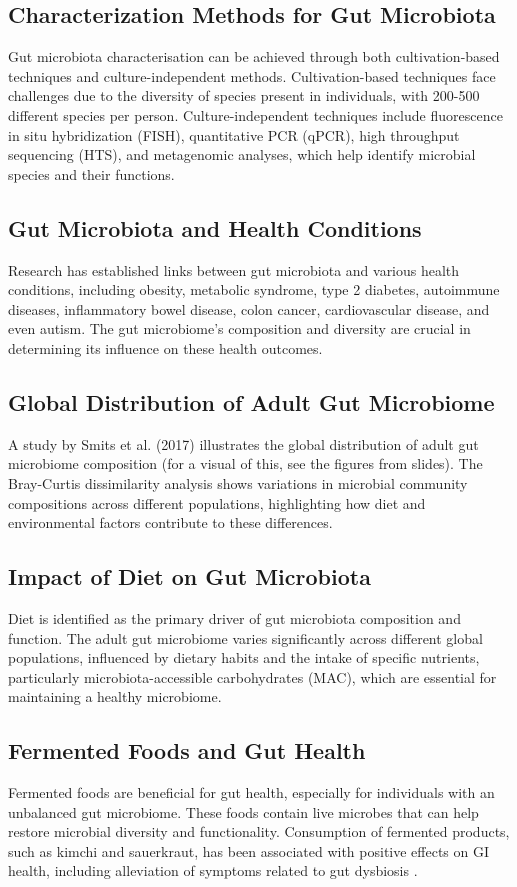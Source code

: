 \subsection{Characterization Methods for Gut Microbiota} 
Gut microbiota characterisation can be achieved through both cultivation-based techniques and culture-independent methods. Cultivation-based techniques face challenges due to the diversity of species present in individuals, with 200-500 different species per person. Culture-independent techniques include fluorescence in situ hybridization (FISH), quantitative PCR (qPCR), high throughput sequencing (HTS), and metagenomic analyses, which help identify microbial species and their functions.

\subsection{Gut Microbiota and Health Conditions} 
Research has established links between gut microbiota and various health conditions, including obesity, metabolic syndrome, type 2 diabetes, autoimmune diseases, inflammatory bowel disease, colon cancer, cardiovascular disease, and even autism. The gut microbiome's composition and diversity are crucial in determining its influence on these health outcomes.

\subsection{Global Distribution of Adult Gut Microbiome} 
A study by Smits et al. (2017) illustrates the global distribution of adult gut microbiome composition (for a visual of this, see the figures from slides). The Bray-Curtis dissimilarity analysis shows variations in microbial community compositions across different populations, highlighting how diet and environmental factors contribute to these differences.

\subsection{Impact of Diet on Gut Microbiota} 
Diet is identified as the primary driver of gut microbiota composition and function. The adult gut microbiome varies significantly across different global populations, influenced by dietary habits and the intake of specific nutrients, particularly microbiota-accessible carbohydrates (MAC), which are essential for maintaining a healthy microbiome.

\subsection{Fermented Foods and Gut Health} 
Fermented foods are beneficial for gut health, especially for individuals with an unbalanced gut microbiome. These foods contain live microbes that can help restore microbial diversity and functionality. Consumption of fermented products, such as kimchi and sauerkraut, has been associated with positive effects on GI health, including alleviation of symptoms related to gut dysbiosis \cite*{L10-Pro_Pre}.

